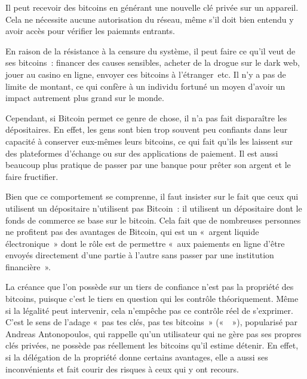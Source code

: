 Il peut recevoir des bitcoins en générant une nouvelle clé privée sur un appareil. Cela ne nécessite aucune autorisation du réseau, même s'il doit bien entendu y avoir accès pour vérifier les paiemnts entrants.

En raison de la résistance à la censure du système, il peut faire ce qu'il veut de ses bitcoins~: financer des causes sensibles, acheter de la drogue sur le dark web, jouer au casino en ligne, envoyer ces bitcoins à l'étranger~etc. Il n'y a pas de limite de montant, ce qui confère à un individu fortuné un moyen d'avoir un impact autrement plus grand sur le monde.

Cependant, si Bitcoin permet ce genre de chose, il n'a pas fait disparaître les dépositaires. En effet, les gens sont bien trop souvent peu confiants dans leur capacité à conserver eux-mêmes leurs bitcoins, ce qui fait qu'ils les laissent sur des plateformes d'échange ou sur des applications de paiement. Il est aussi beaucoup plus pratique de passer par une banque pour prêter son argent et le faire fructifier.

Bien que ce comportement se comprenne, il faut insister sur le fait que ceux qui utilisent un dépositaire n'utilisent pas Bitcoin~: il utilisent un dépositaire dont le fonds de commerce se base sur le bitcoin. Cela fait que de nombreuses personnes ne profitent pas des avantages de Bitcoin, qui est un «~argent liquide électronique~» dont le rôle est de permettre «~aux paiements en ligne d'être envoyés directement d'une partie à l'autre sans passer par une institution financière~».

La créance que l'on possède sur un tiers de confiance n'est pas la propriété des bitcoins, puisque c'est le tiers en question qui les contrôle théoriquement. Même si la légalité peut intervenir, cela n'empêche pas ce contrôle réel de s'exprimer. C'est le sens de l'adage «~pas tes clés, pas tes bitcoins~» («~~»), popularisé par Andreas Antonopoulos, qui rappelle qu'un utilisateur qui ne gère pas ses propres clés privées, ne possède pas réellement les bitcoins qu'il estime détenir. En effet, si la délégation de la propriété donne certains avantages, elle a aussi ses inconvénients et fait courir des risques à ceux qui y ont recours.

